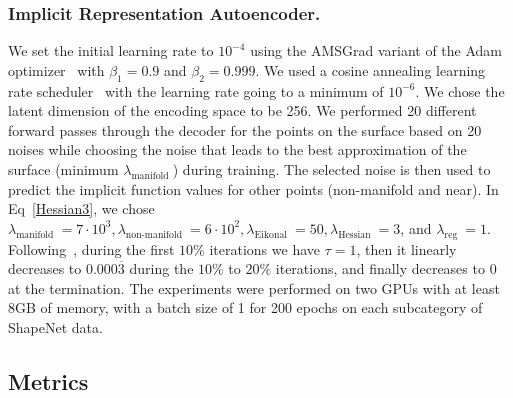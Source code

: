         \subsubsection{Implicit Representation Autoencoder.}
        We set the initial learning rate to $10^{-4}$ using the AMSGrad variant of the Adam optimizer~\cite{AMSGrad} with $\beta_1 = 0.9$ and $\beta_2 = 0.999$. We used a cosine annealing learning rate scheduler~\cite{CosLR} with the learning rate going to a minimum of $10^{-6}$. We chose the latent dimension of the encoding space to be 256. We performed 20 different forward passes through the decoder for the points on the surface based on 20 noises while choosing the noise that leads to the best approximation of the surface (minimum $\lambda_{\text {manifold }}$) during training. The selected noise is then used to predict the implicit function values for other points (non-manifold and near). In Eq~\ref{Hessian3}, we chose $\lambda_{\text {manifold }} = 7\cdot 10^3, \lambda_{\text {non-manifold }} = 6\cdot 10^2, \lambda_{\text {Eikonal }} = 50, \lambda_{\text{Hessian }} = 3$, and $\lambda_{\text {reg }} = 1$. Following~\cite{NeuralHessian}, during the first $10\%$ iterations we have $\tau = 1$, then it linearly decreases to $0.000\overline{3}$ during the $10\%$ to $20\%$ iterations, and finally decreases to $0$ at the termination. The experiments were performed on two GPUs with at least 8GB of memory, with a batch size of 1 for 200 epochs on each subcategory of ShapeNet data. 
        

    \subsection{Metrics}



